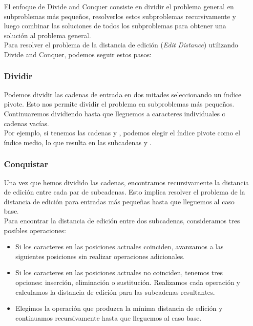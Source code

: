 El enfoque de Divide and Conquer consiste en dividir el problema general en subproblemas más pequeños, resolverlos estos subproblemas recursivamente y luego combinar las soluciones de todos los subproblemas para obtener una solución al problema general.\\

Para resolver el problema de la distancia de edición (\textit{Edit Distance}) utilizando Divide and Conquer, podemos seguir estos pasos:

\subsubsection*{Dividir}
Podemos dividir las cadenas de entrada en dos mitades seleccionando un índice pivote. Esto nos permite dividir el problema en subproblemas más pequeños. Continuaremos dividiendo hasta que lleguemos a caracteres individuales o cadenas vacías.\\

Por ejemplo, si tenemos las cadenas  y , podemos elegir el índice pivote como el índice medio, lo que resulta en las subcadenas  y .

\subsubsection*{Conquistar}
Una vez que hemos dividido las cadenas, encontramos recursivamente la distancia de edición entre cada par de subcadenas. Esto implica resolver el problema de la distancia de edición para entradas más pequeñas hasta que lleguemos al caso base.\\

Para encontrar la distancia de edición entre dos subcadenas, consideramos tres posibles operaciones:

\begin{itemize}
    \item Si los caracteres en las posiciones actuales coinciden, avanzamos a las siguientes posiciones sin realizar operaciones adicionales.
    \item Si los caracteres en las posiciones actuales no coinciden, tenemos tres opciones: inserción, eliminación o sustitución. Realizamos cada operación y calculamos la distancia de edición para las subcadenas resultantes.
    \item Elegimos la operación que produzca la mínima distancia de edición y continuamos recursivamente hasta que lleguemos al caso base.
\end{itemize}

